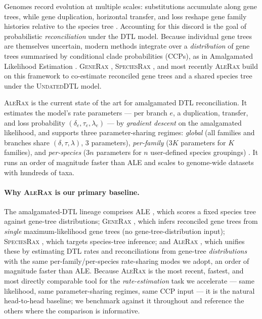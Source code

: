 \documentclass[11pt]{article}
\newcommand{\bdelta}{\delta}
\newcommand{\btau}{\tau}
\newcommand{\blambda}{\lambda}
\begin{document}
Genomes record evolution at multiple scales: substitutions accumulate along
gene trees, while gene duplication, horizontal transfer, and loss reshape gene
family histories relative to the species tree \citep{Szollosi2015}. Accounting
for this discord is the goal of probabilistic \emph{reconciliation} under the
DTL model. Because individual gene trees are themselves uncertain, modern
methods integrate over a \emph{distribution} of gene trees summarised by
conditional clade probabilities (CCPs), as in Amalgamated Likelihood
Estimation \citep{Szollosi2013,Hohna2012,Larget2013}. \textsc{GeneRax}
\citep{Morel2020}, \textsc{SpeciesRax} \citep{Morel2022}, and most recently
\textsc{AleRax} \citep{Morel2024} build on this framework to co-estimate
reconciled gene trees and a shared species tree under the \textsc{UndatedDTL}
model.

\textsc{AleRax} is the current state of the art for amalgamated DTL
reconciliation. It estimates the model's rate parameters --- per branch $e$, a
duplication, transfer, and loss probability
$(\bdelta_e,\btau_e,\blambda_e)$ --- by \emph{gradient descent} on the
amalgamated likelihood, and supports three parameter-sharing regimes:
\emph{global} (all families and branches share $(\bdelta,\btau,\blambda)$,
$3$ parameters), \emph{per-family} ($3K$ parameters for $K$ families), and
\emph{per-species} ($3n$ parameters for $n$ user-defined species groupings)
\citep{Morel2024}. It runs an order of magnitude faster than ALE and scales to
genome-wide datasets with hundreds of taxa.

\paragraph{Why \textsc{AleRax} is our primary baseline.} The amalgamated-DTL
lineage comprises ALE \citep{Szollosi2013}, which scores a fixed species tree
against gene-tree distributions; \textsc{GeneRax} \citep{Morel2020}, which
infers reconciled gene trees from \emph{single} maximum-likelihood gene trees
(no gene-tree-distribution input); \textsc{SpeciesRax} \citep{Morel2022}, which
targets species-tree inference; and \textsc{AleRax} \citep{Morel2024}, which
unifies these by estimating DTL rates and reconciliations from gene-tree
\emph{distributions} with the same per-family/per-species rate-sharing modes we
adopt, an order of magnitude faster than ALE. Because \textsc{AleRax} is the
most recent, fastest, and most directly comparable tool for the
\emph{rate-estimation} task we accelerate --- same likelihood, same
parameter-sharing regimes, same CCP input --- it is the natural head-to-head
baseline; we benchmark against it throughout and reference the others where the
comparison is informative.
\end{document}
